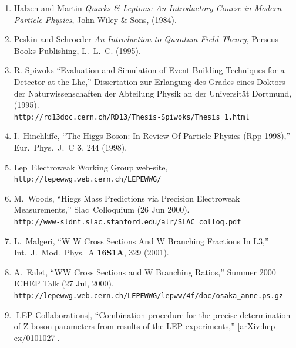 \documentclass[12pt]{article}
\def\lep{{\sc Lep}}
\def\slac{{\sc Slac}}
\def\lhc{{\sc Lhc}}
\begin{document}
\begin{flushleft}
  \begin{enumerate}
  
    \item Halzen and Martin {\it Quarks \& Leptons: An Introductory
    Course in Modern Particle Physics}, John Wiley \& Sons, (1984).
    \label{cite:hm}
  
    \item Peskin and Schroeder {\it An Introduction to Quantum Field
    Theory}, Perseus Books Publishing, L.~L.~C. (1995).
    \label{cite:ps}
  
    \item R. Spiwoks ``Evaluation and Simulation of Event Building
    Techniques for a Detector at the \lhc,'' Dissertation zur Erlangung
    des Grades eines Doktors der Naturwissenschaften der Abteilung
    Physik an der Universit\"at Dortmund, (1995). \\
    {\tt http://rd13doc.cern.ch/RD13/Thesis-Spiwoks/Thesis\_1.html}
    \label{cite:spiwoks}
  
    \item I.~Hinchliffe,
    ``The Higgs Boson: In Review Of Particle Physics (Rpp 1998),''
    Eur.\ Phys.\ J.\ C {\bf 3}, 244 (1998).
    \label{cite:hinchliffe}
  
    \item \lep\ Electroweak Working Group web-site, \\
    {\tt http://lepewwg.web.cern.ch/LEPEWWG/}
    \label{cite:lepewwg}
  
    \item M.~Woods, ``Higgs Mass Predictions via Precision Electroweak Measurements,''
    \slac\ Colloquium (26 Jun 2000). \\
    {\tt http://www-sldnt.slac.stanford.edu/alr/SLAC\_colloq.pdf}
    \label{cite:sldwewg}
  
    \item L.~Malgeri,
    ``W W Cross Sections And W Branching Fractions In L3,''
    Int.\ J.\ Mod.\ Phys.\ A {\bf 16S1A}, 329 (2001).
    \label{cite:lep_ww}
  
    \item A.~Ealet, ``WW Cross Sections and W Branching Ratios,''
    Summer 2000 ICHEP Talk (27 Jul, 2000). \\
    {\tt http://lepewwg.web.cern.ch/LEPEWWG/lepww/4f/doc/osaka\_anne.ps.gz}
    \label{cite:lep_ww_anne}
  
    \item \mbox{[}LEP Collaborations\mbox{]},
    ``Combination procedure for the precise determination of Z boson
    parameters from results of the LEP experiments,''
    [arXiv:hep-ex/0101027].
    \label{cite:z_width}
  

\end{enumerate}
\end{flushleft}
\end{document}
